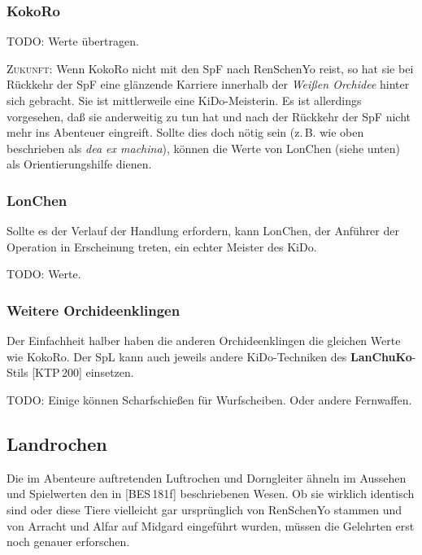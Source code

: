 \documentclass[
a4paper,
twoside,
DIV=calc,
BCOR=4mm,
fontsize=9pt,
twocolumn=on,
titlepage=on,
parskip=half
]{scrartcl}
\begin{document}
\subsubsection{KokoRo}


TODO: Werte übertragen.

\textsc{Zukunft:} Wenn KokoRo nicht mit den SpF nach RenSchenYo reist,
so hat sie bei Rückkehr der SpF eine glänzende Karriere innerhalb der
\emph{Weißen Orchidee} hinter sich gebracht. Sie ist mittlerweile eine
KiDo-Meisterin. Es ist allerdings vorgesehen, daß sie anderweitig zu
tun hat und nach der Rückkehr der SpF nicht mehr ins Abenteuer
eingreift. Sollte dies doch nötig sein (z.\,B. wie oben beschrieben
als \emph{dea ex machina}), können die Werte von LonChen (siehe
unten) als Orientierungshilfe dienen.

\subsubsection{LonChen}

Sollte es der Verlauf der Handlung erfordern, kann LonChen, der
Anführer der Operation in Erscheinung treten, ein echter Meister des
KiDo.

TODO: Werte.

\subsubsection{Weitere Orchideenklingen}

Der Einfachheit halber haben die anderen Orchideenklingen die
gleichen Werte wie KokoRo. Der SpL kann auch jeweils andere
KiDo-Techniken des \textbf{LanChuKo}-Stils [KTP\,200] einsetzen.

TODO: Einige können Scharfschießen für Wurfscheiben. Oder andere
Fernwaffen.

\subsection{Landrochen}

Die im Abenteure auftretenden Luftrochen und Dorngleiter ähneln im
Aussehen und Spielwerten den in [BES\,181f] beschriebenen Wesen. Ob
sie wirklich identisch sind oder diese Tiere vielleicht gar
ursprünglich von RenSchenYo stammen und von Arracht und Alfar auf
Midgard eingeführt wurden, müssen die Gelehrten erst noch genauer
erforschen.
\end{document}
